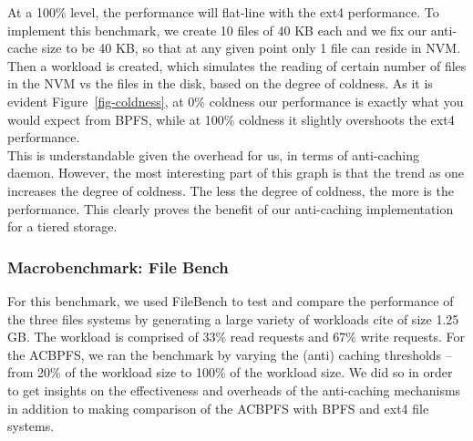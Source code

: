  At a 100\% level, the performance will flat-line with the ext4 performance. To implement this benchmark, we create 10 files of 40 KB each and we fix our anti-cache size to be 40 KB, so that at any given point only 1 file can reside in NVM. Then a workload is created, which simulates the reading of certain number of files in the NVM vs the files in the disk, based on the degree of coldness. As it is evident Figure~\ref{fig-coldness}, at 0\% coldness our performance is exactly what you would expect from BPFS, while at 100\% coldness it slightly overshoots the ext4 performance. \\

This is understandable given the overhead for us, in terms of anti-caching daemon. However, the most interesting part of this graph is that the trend as one increases the degree of coldness. The less the degree of coldness, the more is the performance. This clearly proves the benefit of our anti-caching implementation for a tiered storage.

 
\subsubsection{Macrobenchmark: File Bench}
For this benchmark, we used FileBench to test and compare the performance of the three files systems by generating a large variety of workloads {cite} of size 1.25 GB. The workload is comprised of 33\% read requests and 67\% write requests. For the AC\-BPFS, we ran the benchmark by varying the (anti) caching thresholds – from 20\% of the workload size to 100\% of the workload size. We did so in order to get insights on the effectiveness and overheads of the anti-caching mechanisms in addition to making comparison of the AC\-BPFS with BPFS and ext4 file systems.


